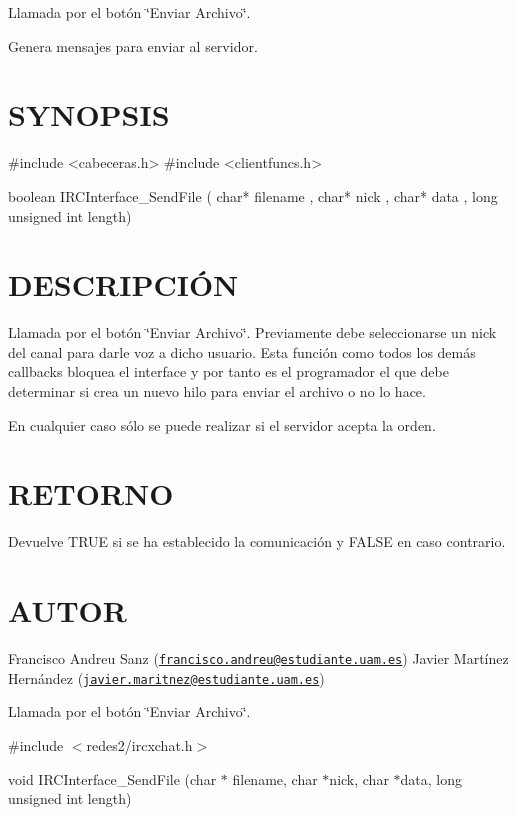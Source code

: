 Llamada por el botón \char`\"{}\-Enviar Archivo\char`\"{}.

Genera mensajes para enviar al servidor.\hypertarget{ServerReply_SYNOPSIS}{}\section{S\-Y\-N\-O\-P\-S\-I\-S}\label{ServerReply_SYNOPSIS}
\begin{DoxyVerb} #include  <cabeceras.h>
   #include  <clientfuncs.h>

   boolean IRCInterface_SendFile ( char* filename , char*  nick , char*  data , long unsigned int length) 
\end{DoxyVerb}
\hypertarget{ServerReply_descripcion}{}\section{D\-E\-S\-C\-R\-I\-P\-C\-IÓ\-N}\label{ServerReply_descripcion}
Llamada por el botón \char`\"{}\-Enviar Archivo\char`\"{}. Previamente debe seleccionarse un nick del canal para darle voz a dicho usuario. Esta función como todos los demás callbacks bloquea el interface y por tanto es el programador el que debe determinar si crea un nuevo hilo para enviar el archivo o no lo hace.

En cualquier caso sólo se puede realizar si el servidor acepta la orden.\hypertarget{ServerReply_retorno}{}\section{R\-E\-T\-O\-R\-N\-O}\label{ServerReply_retorno}
Devuelve T\-R\-U\-E si se ha establecido la comunicación y F\-A\-L\-S\-E en caso contrario.\hypertarget{ServerReply_authors}{}\section{A\-U\-T\-O\-R}\label{ServerReply_authors}
Francisco Andreu Sanz (\href{mailto:francisco.andreu@estudiante.uam.es}{\tt francisco.\-andreu@estudiante.\-uam.\-es}) Javier Martínez Hernández (\href{mailto:javier.maritnez@estudiante.uam.es}{\tt javier.\-maritnez@estudiante.\-uam.\-es}) 



Llamada por el botón \char`\"{}\-Enviar Archivo\char`\"{}.

\#include $<$redes2/ircxchat.\-h$>$

void I\-R\-C\-Interface\-\_\-\-Send\-File (char $\ast$ filename, char $\ast$nick, char $\ast$data, long unsigned int length)

